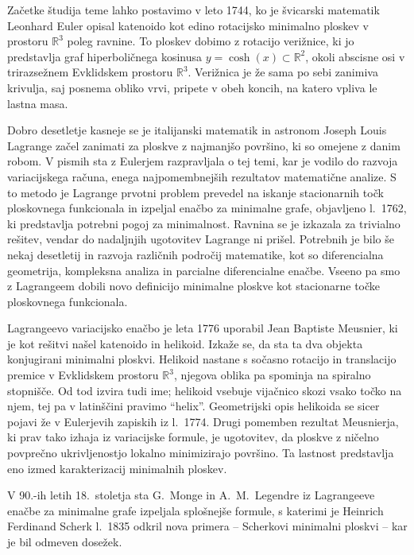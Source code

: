 \documentclass[12pt,a4paper,twoside]{article}
\theoremstyle{definition} %
\theoremstyle{plain} %
\numberwithin{equation}{section}  %
\newcommand{\R}{\mathbb R}
\begin{document}
Začetke študija teme lahko postavimo v leto 1744, ko je švicarski matematik Leonhard Euler opisal katenoido kot edino rotacijsko minimalno ploskev v prostoru $\R^3$ poleg ravnine. To ploskev dobimo z rotacijo verižnice, ki jo predstavlja graf hiperboličnega kosinusa $y = \cosh(x) \subset \R^2$, okoli abscisne osi v trirazsežnem Evklidskem prostoru $\R^3$. Verižnica je že sama po sebi zanimiva krivulja, saj posnema obliko vrvi, pripete v obeh koncih, na katero vpliva le lastna masa.

Dobro desetletje kasneje se je italijanski matematik in astronom Joseph Louis Lagrange začel zanimati za ploskve z najmanjšo površino, ki so omejene z danim robom. V pismih sta z Eulerjem razpravljala o tej temi, kar je vodilo do razvoja variacijskega računa, enega najpomembnejših rezultatov matematične analize. S to metodo je Lagrange prvotni problem prevedel na iskanje stacionarnih točk ploskovnega funkcionala in izpeljal enačbo za minimalne grafe, objavljeno l.~1762, ki predstavlja potrebni pogoj za minimalnost. Ravnina se je izkazala za trivialno rešitev, vendar do nadaljnjih ugotovitev Lagrange ni prišel. Potrebnih je bilo še nekaj desetletij in razvoja različnih področij matematike, kot so diferencialna geometrija, kompleksna analiza in parcialne diferencialne enačbe. Vseeno pa smo z Lagrangeem dobili novo definicijo minimalne ploskve kot stacionarne točke ploskovnega funkcionala.

Lagrangeevo variacijsko enačbo je leta 1776 uporabil Jean Baptiste Meusnier, ki je kot rešitvi našel katenoido in helikoid. Izkaže se, da sta ta dva objekta konjugirani minimalni ploskvi. Helikoid nastane s sočasno rotacijo in translacijo premice v Evklidskem prostoru $\R^3$, njegova oblika pa spominja na spiralno stopnišče. Od tod izvira tudi ime; helikoid vsebuje vijačnico skozi vsako točko na njem, tej pa v latinščini pravimo ``helix''. Geometrijski opis helikoida se sicer pojavi že v Eulerjevih zapiskih iz l.~1774. 
Drugi pomemben rezultat Meusnierja, ki prav tako izhaja iz variacijske formule, je ugotovitev, da ploskve z ničelno povprečno ukrivljenostjo lokalno minimizirajo površino. Ta lastnost predstavlja eno izmed karakterizacij minimalnih ploskev.

V 90.-ih letih 18.~stoletja sta G.~Monge in A.~M.~Legendre iz Lagrangeeve enačbe za minimalne grafe izpeljala splošnejše formule, s katerimi je Heinrich Ferdinand Scherk l.~1835 odkril nova primera -- Scherkovi minimalni ploskvi -- kar je bil odmeven dosežek. 
\end{document}
